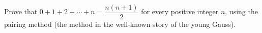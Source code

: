 Prove that $0+1+2+\cdots+n=\dfrac{n(n+1)}{2}$ for every positive integer $n$, using the pairing method (the method in the well-known story of the young Gauss).
